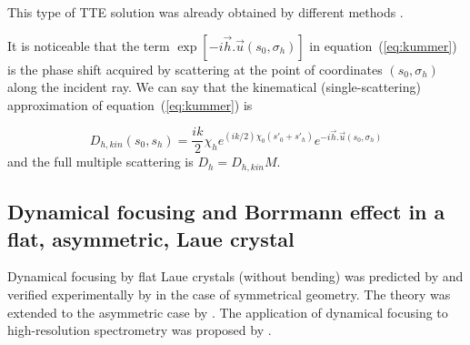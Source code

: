 \documentclass[preprint]{iucr}              %
\begin{document}
This type of TTE solution was already obtained by different methods \cite{Petrashen1974,Katagawa1974,Litzmann1974,Chukhovski1977}.

It is noticeable that the term $\exp[-i\vec h . \vec u (s_0,\sigma_h)]$ in equation~(\ref{eq:kummer}) is the phase shift acquired by scattering at the point of coordinates $(s_0,\sigma_h)$ along the incident ray. We can say that the kinematical (single-scattering) approximation of equation~(\ref{eq:kummer}) is 

\begin{equation}
\label{eq:kummerapprox}
    D_{h,kin}(s_0,s_h) = \frac{i k }{2} \chi_h e^{(ik/2) \chi_0 (s'_0 + s'_h)} e^{-i \vec h . \vec u (s_0,\sigma_h)} 
\end{equation}
and the full multiple scattering is $D_h=D_{h,kin} M$.
          
\subsection{Dynamical focusing and Borrmann effect in a flat, asymmetric, Laue crystal}
\label{sec:LaueFlat}


Dynamical focusing by flat Laue crystals (without bending) was predicted by  and verified experimentally by \cite{Aristov1978,Aristov1980PhysStatSol,Aristov1980}
in the case of symmetrical geometry. The theory was extended to the asymmetric case by . The application of dynamical focusing to high-resolution spectrometry was proposed by .
\end{document}
